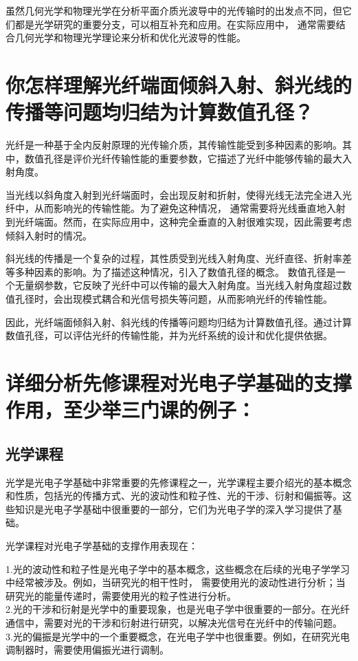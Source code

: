 \documentclass[12pt, a4paper, oneside]{article}
\begin{document}
\begin{spacing}{2.0}
虽然几何光学和物理光学在分析平面介质光波导中的光传输时的出发点不同，但它们都是光学研究的重要分支，可以相互补充和应用。在实际应用中，
通常需要结合几何光学和物理光学理论来分析和优化光波导的性能。

\section{你怎样理解光纤端面倾斜入射、斜光线的传播等问题均归结为计算数值孔径？}
光纤是一种基于全内反射原理的光传输介质，其传输性能受到多种因素的影响。其中，数值孔径是评价光纤传输性能的重要参数，它描述了光纤中能够传输的最大入射角度。

当光线以斜角度入射到光纤端面时，会出现反射和折射，使得光线无法完全进入光纤中，从而影响光的传输性能。为了避免这种情况，
通常需要将光线垂直地入射到光纤端面。然而，在实际应用中，这种完全垂直的入射很难实现，因此需要考虑倾斜入射时的情况。

斜光线的传播是一个复杂的过程，其性质受到光线入射角度、光纤直径、折射率差等多种因素的影响。为了描述这种情况，引入了数值孔径的概念。
数值孔径是一个无量纲参数，它反映了光纤中可以传输的最大入射角度。当光线入射角度超过数值孔径时，会出现模式耦合和光信号损失等问题，从而影响光纤的传输性能。

因此，光纤端面倾斜入射、斜光线的传播等问题均归结为计算数值孔径。通过计算数值孔径，可以评估光纤的传输性能，并为光纤系统的设计和优化提供依据。
\section{详细分析先修课程对光电子学基础的支撑作用，至少举三门课的例子：}
\subsection{光学课程}
光学是光电子学基础中非常重要的先修课程之一，光学课程主要介绍光的基本概念和性质，包括光的传播方式、光的波动性和粒子性、光的干涉、衍射和偏振等。这些知识是光电子学基础中很重要的一部分，它们为光电子学的深入学习提供了基础。

光学课程对光电子学基础的支撑作用表现在：

1.光的波动性和粒子性是光电子学中的基本概念，这些概念在后续的光电子学学习中经常被涉及。例如，当研究光的相干性时，
需要使用光的波动性进行分析；当研究光的能量传递时，需要使用光的粒子性进行分析。
\\
2.光的干涉和衍射是光学中的重要现象，也是光电子学中很重要的一部分。在光纤通信中，需要对光的干涉和衍射进行研究，以解决光信号在光纤中的传输问题。
\\
3.光的偏振是光学中的一个重要概念，在光电子学中也很重要。例如，在研究光电调制器时，需要使用偏振光进行调制。



\end{spacing}
\end{document}
